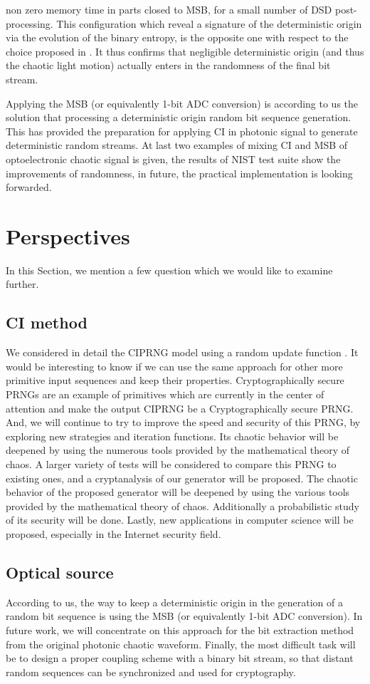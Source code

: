 non zero memory time in parts closed to MSB, for a small number of DSD post-processing. This configuration which reveal a signature of the deterministic origin via the evolution of the binary entropy, is the opposite one with respect to the choice proposed in \cite{ultrafast2009, ultrafast2010}. It thus confirms that negligible deterministic origin (and thus the chaotic light motion) actually enters in the randomness of the final bit stream.

Applying the MSB (or equivalently 1-bit ADC conversion) is according to us the solution that processing a deterministic origin random bit sequence generation. This has provided the preparation for applying CI in photonic signal to generate deterministic random streams. At last two examples of mixing CI and MSB of optoelectronic chaotic signal is given, the results of NIST test suite show the improvements of randomness, in future, the practical implementation is looking forwarded. 


\chapter{Perspectives}
In this Section, we mention a few question which we would like to examine further.
\section{CI method}
We considered in detail the CIPRNG model using a random update function . It
would be interesting to know if we can use the same approach for other more primitive input sequences and keep their properties. Cryptographically secure PRNGs are an example of primitives which are currently in the center of attention and make the output CIPRNG be a Cryptographically secure PRNG. And, we will continue to try to improve the speed
and security of this PRNG, by exploring new strategies and
iteration functions. Its chaotic behavior will be deepened by
using the numerous tools provided by the mathematical theory
of chaos. A larger variety of tests will be considered to compare this
PRNG to existing ones, and a cryptanalysis of our generator will be
proposed. The chaotic behavior of the proposed generator will be deepened
by using the various tools provided by the mathematical theory of chaos. Additionally a probabilistic study of
its security will be done. Lastly, new applications in computer
science will be proposed, especially in the Internet security
field.

\section{Optical source}
According to
us, the way to keep a deterministic origin in the generation of a
random bit sequence is using the MSB (or equivalently 1-bit ADC conversion). In future work, we will concentrate on this approach for  the
bit extraction method from the original photonic chaotic
waveform. Finally, the most
difficult task will be to design a proper coupling scheme with a
binary bit stream, so that distant random sequences can be
synchronized and used for cryptography.